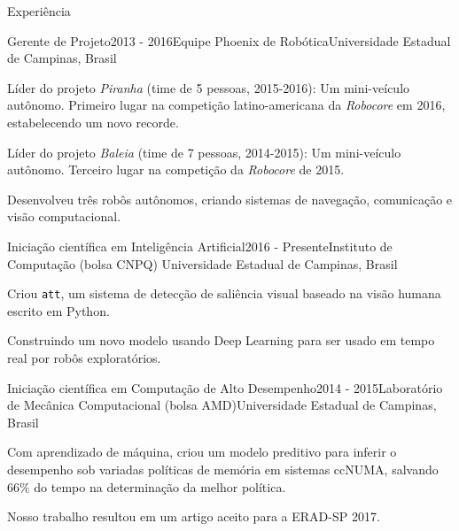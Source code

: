 \documentclass[8pt]{resume}
\newcommand{\tit}[1]{\textit{#1}}
\newcommand{\ttt}[1]{\texttt{#1}}
\begin{document}
\begin{rSection}{Experiência}

\begin{rSubsection}{Gerente de Projeto}{2013 - 2016}{Equipe Phoenix de Robótica}{Universidade Estadual de Campinas, Brasil}
    \item Líder do projeto \tit{Piranha} (time de 5 pessoas, 2015-2016):
        Um mini-veículo autônomo.
        Primeiro lugar na competição latino-americana
        da \tit{Robocore} em 2016, estabelecendo um novo recorde.
    \item Líder do projeto \tit{Baleia} (time de 7 pessoas, 2014-2015):
        Um mini-veículo autônomo.
        Terceiro lugar na competição da \tit{Robocore} de 2015.
    \item Desenvolveu três robôs autônomos, criando sistemas de
        navegação, comunicação e visão computacional.
\end{rSubsection}

\begin{rSubsection}{Iniciação científica em Inteligência Artificial}{2016 - Presente}{Instituto de Computação (bolsa CNPQ)}
    {Universidade Estadual de Campinas, Brasil}
    \item Criou \ttt{att}, um sistema de detecção de saliência visual
        baseado na visão humana escrito em Python.
    \item Construindo um novo modelo usando Deep Learning para
        ser usado em tempo real por robôs exploratórios.
\end{rSubsection}

\begin{rSubsection}{Iniciação científica em Computação de Alto Desempenho}{2014 - 2015}{Laboratório de Mecânica Computacional (bolsa AMD)}{Universidade Estadual de Campinas, Brasil}
    \item Com aprendizado de máquina, criou um modelo preditivo para inferir
        o desempenho sob variadas políticas de memória em sistemas ccNUMA,
        salvando $66\%$ do tempo na determinação da melhor política.
    \item Nosso trabalho resultou em um artigo aceito para a ERAD-SP 2017.
\end{rSubsection}


\end{rSection}
\end{document}
